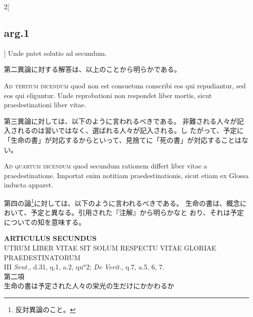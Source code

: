 \documentclass[paper=a4paper,fontsize=10pt,jafontsize=9pt,titlepage]{jlreq}
\begin{document}
\begin{paracol}{2}[\subsection{arg.1}]
Unde patet solutio ad secundum.

\switchcolumn

第二異論に対する解答は、以上のことから明らかである。

\switchcolumn*[\subsection{ad.3}]

{\scshape Ad tertium dicendum} quod non est consuetum
 conscribi eos qui repudiantur, sed eos qui eliguntur. Unde reprobationi
 non respondet liber mortis, sicut praedestinationi liber vitae.

\switchcolumn

第三異論に対しては、以下のように言われるべきである。
非難される人々が記入されるのは習いではなく、選ばれる人々が記入される。し
 たがって、予定に「生命の書」が対応するからといって、見捨てに「死の書」が対応することはない。

\switchcolumn*[\subsection{ad.4}]

{\scshape Ad quartum dicendum} quod secundum rationem
 differt liber vitae a praedestinatione. Importat enim notitiam
 praedestinationis, sicut etiam ex Glossa inducta apparet.

\switchcolumn

第四の論\footnote{反対異論のこと。}に対しては、以下のように言われるべきである。
生命の書は、概念において、予定と異なる。引用された『注解』から明らかなと
 おり、それは予定についての知を意味する。

\end{paracol}
\newpage
{}
{}
\setcounter{section}{2}
\setcounter{subsection}{0}



\begin{center}
 {\Large {\bfseries ARTICULUS SECUNDUS}}\\
 {\large UTRUM LIBER VITAE SIT SOLUM RESPECTU VITAE GLORIAE PRAEDESTINATORUM}\\
 {\footnotesize III {\itshape Sent.}, d.31, q.1, a.2, qu$^a$2; {\itshape
 De Verit.}, q.7, a.5, 6, 7.}\\
 {\Large 第二項\\生命の書は予定された人々の栄光の生だけにかかわるか}
\end{center}
\end{document}
